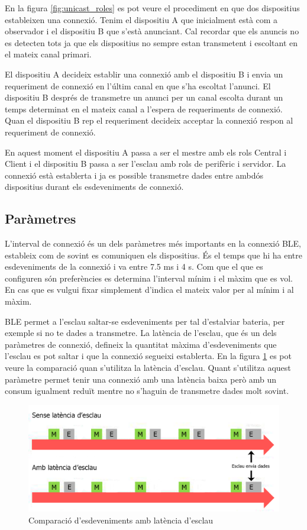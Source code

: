 En la figura \ref{fig:unicast_roles} es pot veure el procediment en que dos dispositius estableixen una connexió.
Tenim el dispositiu A que inicialment està com a observador i el dispositiu B que s'està anunciant.
Cal recordar que els anuncis no es detecten tots ja que els dispositius no sempre estan transmetent i escoltant en el mateix canal primari.

El dispositiu A decideix establir una connexió amb el dispositiu B i envia un requeriment de connexió en l'últim canal en que s'ha escoltat l'anunci.
El dispositiu B després de transmetre un anunci per un canal escolta durant un temps determinat en el mateix canal a l'espera de requeriments de connexió.
Quan el dispositiu B rep el requeriment decideix acceptar la connexió respon al requeriment de connexió.

En aquest moment el dispositiu A passa a ser el mestre amb els rols Central i Client i el dispositiu B passa a ser l'esclau amb rols de perifèric i servidor.
La connexió està establerta i ja es possible transmetre dades entre ambdós dispositius durant els esdeveniments de connexió. 


\subsection{Paràmetres}
L'interval de connexió és un dels paràmetres més importants en la connexió BLE, estableix com de sovint es comuniquen els dispositius.
És el temps que hi ha entre esdeveniments de la connexió i va entre 7.5 ms i 4 s.
Com que el que es configuren són preferències es determina l'interval mínim i el màxim que es vol.
En cas que es vulgui fixar simplement d'indica el mateix valor per al mínim i al màxim.

BLE permet a l'esclau saltar-se esdeveniments per tal d'estalviar bateria, per exemple si no te dades a transmetre.
La latència de l'esclau, que és un dels paràmetres de connexió, defineix la quantitat màxima d'esdeveniments que l'esclau es pot saltar i que la connexió segueixi establerta.
En la figura \ref{fig:slave_latency} es pot veure la comparació quan s'utilitza la latència d'esclau.
Quant s'utilitza aquest paràmetre permet tenir una connexió amb una latència baixa però amb un consum igualment reduït mentre no s'haguin de transmetre dades molt sovint.

\begin{figure}[!h]
	\begin{center}
		\includegraphics{./images/slave_latency_new.png}
		\caption{Comparació d'esdeveniments amb latència d'esclau \cite{slave_latency}}
		\label{fig:slave_latency}
	\end{center}
\end{figure}

